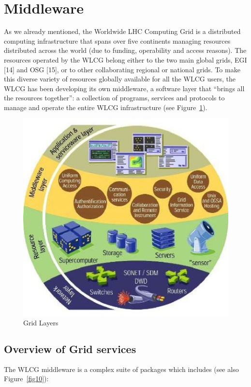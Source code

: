 \section{Middleware}

As we already mentioned, the Worldwide LHC Computing Grid is a
distributed computing infrastructure that spans over five continents
managing resources distributed across the world (due to  funding,
operability and access reasons). The resources operated by the WLCG
belong either to the two main global grids, EGI [14] and OSG [15], or
to other collaborating regional or national grids. To make this
diverse variety of resources globally available for all the WLCG
users, the WLCG has been developing its own middleware, a software
layer that ``brings all the resources together'': a collection of
programs, services and protocols to manage and operate the entire
WLCG infrastructure (see Figure~\ref{fig09}).

\begin{figure}[htb] %
\centering
\includegraphics[width=13cm]{fig09.eps} %
\caption{Grid Layers}\label{fig09}
\end{figure}



\subsection{Overview of Grid services}
%
The WLCG middleware is a complex suite of packages which includes
(see also Figure~\ref{fig10}):


